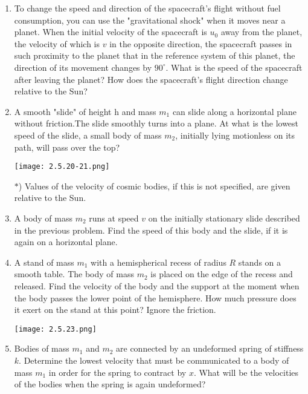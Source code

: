 \documentclass{article}
\begin{document}
\begin{enumerate}[label=2.5.\arabic*]
\item To change the speed and direction of the spacecraft's flight without fuel consumption, you can use the "gravitational shock" when it moves near a planet. When the initial velocity of the spacecraft is $u_0$ away from the planet, the velocity of which is $v$ in the opposite direction, the spacecraft passes in such proximity to the planet that in the reference system of this planet, the direction of its movement changes by $90^\circ$. What is the speed of the spacecraft after leaving the planet? How does the spacecraft's flight direction change relative to the Sun?

\item A smooth "slide" of height h and mass $m_1$ can slide along a horizontal plane without friction.The slide smoothly turns into a plane. At what is the lowest speed of the slide, a small body of mass $m_2$, initially lying motionless on its path, will pass over the top? 
\begin{center}
    \texttt{[image: 2.5.20-21.png]}
\end{center}

$\ast$) Values of the velocity of cosmic bodies, if this is not specified, are given relative to the Sun.

\item A body of mass $m_2$ runs at speed $v$ on the initially stationary slide described in the previous problem. Find the speed of this body and the slide, if it is again on a horizontal plane.

\item A stand of mass $m_1$ with a hemispherical recess of radius $R$ stands on a smooth table. The body of mass $m_2$ is placed on the edge of the recess and released. Find the velocity of the body and the support at the moment when the body passes the lower point of the hemisphere. How much pressure does it exert on the stand at this point? Ignore the friction.

\begin{center}
    \texttt{[image: 2.5.23.png]}
\end{center}

\item Bodies of mass $m_1$ and $m_2$ are connected by an undeformed spring of stiffness $k$. Determine the lowest velocity that must be communicated to a body of mass $m_1$ in order for the spring to contract by $x$. What will be the velocities of the bodies when the spring is again undeformed?


\end{enumerate}
\end{document}
